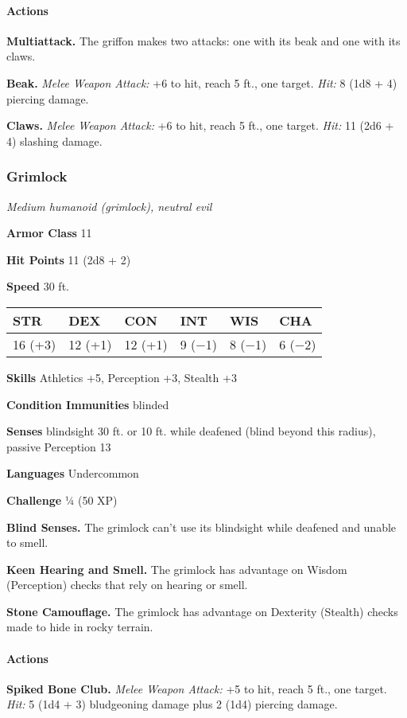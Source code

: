 \documentclass[
]{article}
\begin{document}
\hypertarget{actions-22}{%
\paragraph{Actions}\label{actions-22}}

\textbf{Multiattack.} The griffon makes two attacks: one with its beak
and one with its claws.

\textbf{Beak.} \emph{Melee Weapon Attack:} +6 to hit, reach 5 ft., one
target. \emph{Hit:} 8 (1d8 + 4) piercing damage.

\textbf{Claws.} \emph{Melee Weapon Attack:} +6 to hit, reach 5 ft., one
target. \emph{Hit:} 11 (2d6 + 4) slashing damage.

\hypertarget{grimlock}{%
\subsubsection{Grimlock}\label{grimlock}}

\emph{Medium humanoid (grimlock), neutral evil}

\textbf{Armor Class} 11

\textbf{Hit Points} 11 (2d8 + 2)

\textbf{Speed} 30 ft.

\begin{longtable}[]{@{}llllll@{}}
\toprule
STR & DEX & CON & INT & WIS & CHA\tabularnewline
\midrule
\endhead
16 (+3) & 12 (+1) & 12 (+1) & 9 (−1) & 8 (−1) & 6 (−2)\tabularnewline
\bottomrule
\end{longtable}

\textbf{Skills} Athletics +5, Perception +3, Stealth +3

\textbf{Condition Immunities} blinded

\textbf{Senses} blindsight 30 ft. or 10 ft. while deafened (blind beyond
this radius), passive Perception 13

\textbf{Languages} Undercommon

\textbf{Challenge} ¼ (50 XP)

\textbf{Blind Senses.} The grimlock can't use its blindsight while
deafened and unable to smell.

\textbf{Keen Hearing and Smell.} The grimlock has advantage on Wisdom
(Perception) checks that rely on hearing or smell.

\textbf{Stone Camouflage.} The grimlock has advantage on Dexterity
(Stealth) checks made to hide in rocky terrain.

\hypertarget{actions-23}{%
\paragraph{Actions}\label{actions-23}}

\textbf{Spiked Bone Club.} \emph{Melee Weapon Attack:} +5 to hit, reach
5 ft., one target. \emph{Hit:} 5 (1d4 + 3) bludgeoning damage plus 2
(1d4) piercing damage.
\end{document}
